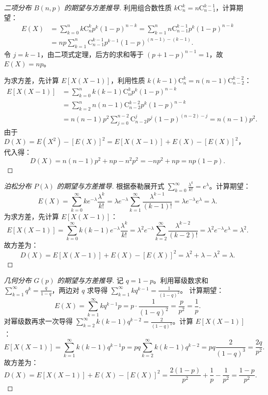 ﻿\documentclass[lang=cn,11pt]{elegantbook}
\begin{document}
\begin{proof}[二项分布 $B(n,p)$ 的期望与方差推导]
利用组合数性质 $k \mathrm{C}_n^k = n \mathrm{C}_{n-1}^{k-1}$，计算期望：
\[
\begin{aligned}
E(X) &= \sum_{k=0}^n k \mathrm{C}_n^k p^k (1-p)^{n-k} = \sum_{k=1}^n n \mathrm{C}_{n-1}^{k-1} p^k (1-p)^{n-k} \\
&= np \sum_{k=1}^n \mathrm{C}_{n-1}^{k-1} p^{k-1} (1-p)^{(n-1)-(k-1)}.
\end{aligned}
\]
令 $j = k-1$，由二项式定理，后方的求和等于 $(p + 1 - p)^{n-1} = 1$，故 $E(X) = np$。

为求方差，先计算 $E[X(X-1)]$，利用性质 $k(k-1)\mathrm{C}_n^k = n(n-1)\mathrm{C}_{n-2}^{k-2}$：
\[
\begin{aligned}
E[X(X-1)] &= \sum_{k=0}^n k(k-1) \mathrm{C}_n^k p^k (1-p)^{n-k} \\
&= \sum_{k=2}^n n(n-1) \mathrm{C}_{n-2}^{k-2} p^k (1-p)^{n-k} \\
&= n(n-1)p^2 \sum_{j=0}^{n-2} \mathrm{C}_{n-2}^j p^j (1-p)^{(n-2)-j} = n(n-1)p^2.
\end{aligned}
\]
由于 $D(X) = E(X^2) - [E(X)]^2 = E[X(X-1)] + E(X) - [E(X)]^2$，代入得：
\[
D(X) = n(n-1)p^2 + np - n^2p^2 = -np^2 + np = np(1-p).
\]
\end{proof}

\begin{proof}[泊松分布 $P(\lambda)$ 的期望与方差推导]
根据泰勒展开式 $\sum_{k=0}^\infty \frac{\lambda^k}{k!} = e^\lambda$。计算期望：
\[
E(X) = \sum_{k=0}^\infty k e^{-\lambda} \frac{\lambda^k}{k!} = \lambda e^{-\lambda} \sum_{k=1}^\infty \frac{\lambda^{k-1}}{(k-1)!} = \lambda e^{-\lambda} e^\lambda = \lambda.
\]
为求方差，先计算 $E[X(X-1)]$：
\[
E[X(X-1)] = \sum_{k=0}^\infty k(k-1) e^{-\lambda} \frac{\lambda^k}{k!} = \lambda^2 e^{-\lambda} \sum_{k=2}^\infty \frac{\lambda^{k-2}}{(k-2)!} = \lambda^2 e^{-\lambda} e^\lambda = \lambda^2.
\]
故方差为：
\[
D(X) = E[X(X-1)] + E(X) - [E(X)]^2 = \lambda^2 + \lambda - \lambda^2 = \lambda.
\]
\end{proof}

\begin{proof}[几何分布 $G(p)$ 的期望与方差推导]
记 $q = 1-p$。利用幂级数求和 $\sum_{k=1}^\infty q^k = \frac{q}{1-q}$，两边对 $q$ 求导得 $\sum_{k=1}^\infty k q^{k-1} = \frac{1}{(1-q)^2}$。
计算期望：
\[
E(X) = \sum_{k=1}^\infty k q^{k-1} p = p \cdot \frac{1}{(1-q)^2} = \frac{p}{p^2} = \frac{1}{p}.
\]
对幂级数再求一次导得 $\sum_{k=2}^\infty k(k-1) q^{k-2} = \frac{2}{(1-q)^3}$。计算 $E[X(X-1)]$：
\[
E[X(X-1)] = \sum_{k=1}^\infty k(k-1) q^{k-1} p = pq \sum_{k=2}^\infty k(k-1) q^{k-2} = pq \frac{2}{(1-q)^3} = \frac{2q}{p^2}.
\]
故方差为：
\[
D(X) = E[X(X-1)] + E(X) - [E(X)]^2 = \frac{2(1-p)}{p^2} + \frac{1}{p} - \frac{1}{p^2} = \frac{1-p}{p^2}.
\]
\end{proof}
\end{document}
